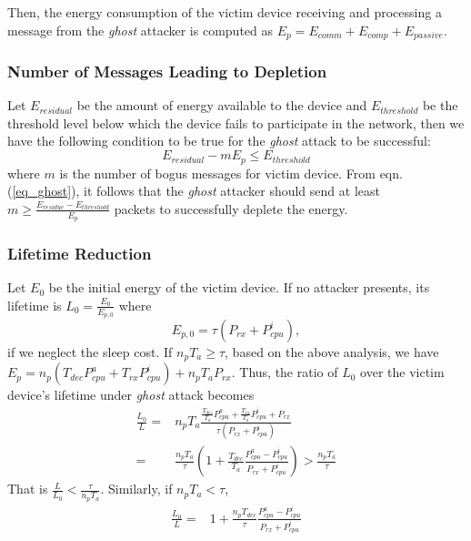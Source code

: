 \documentclass[10pt,journal,cspaper,compsoc]{IEEEtran}
\begin{document}
Then, the energy consumption of the victim device receiving and processing a message from the {\em ghost} attacker is computed as $E_{p} = E_{comm} + E_{comp} + E_{passive}$.

\subsubsection{Number of Messages Leading to Depletion}
Let $E_{residual}$ be the amount of energy available to the device and $E_{threshold}$ be the threshold level below which the device fails to participate in the network, then we have the following condition to be true for the {\em ghost} attack to be successful:
\begin{equation}
E_{residual}-mE_{p} \leq E_{threshold}
\label{eq_ghost}
\end{equation}
where $m$ is the number of bogus messages for victim device. From eqn.(\ref{eq_ghost}), it follows that the {\em ghost} attacker should send at least $m \geq \frac{E_{residue}-E_{threshold}}{E_p}$ packets to successfully deplete the energy.

\subsubsection{Lifetime Reduction}
Let $E_0$ be the initial energy of the victim device. If no attacker presents, its lifetime is $L_0=\frac{E_0}{E_{p,0}}$ where
\begin{equation}
    E_{p,0} = \tau (P_{rx}+P_{cpu}^i),
\end{equation}
if we neglect the sleep cost. If $n_p T_a\geq \tau$, based on the above analysis, we have $E_p = n_p(T_{dec}P^a_{cpu}+ T_{rx}P^i_{cpu}) + n_p T_{a} P_{rx}$. Thus, the ratio of $L_0$ over the victim device's lifetime under {\em ghost} attack becomes
      \begin{align}
      \nonumber       \frac{L_0}{L} =& n_p T_{a} \frac{\frac{T_{dec}}{T_a}P^a_{cpu}+ \frac{T_{rx}}{T_a}P^i_{cpu} + P_{rx}}{\tau (P_{rx}+P_{cpu}^i)}\\
                      =& \frac{n_p T_{a}}{\tau} \left(1+\frac{T_{dec}}{T_a} \frac{P^a_{cpu}-P^i_{cpu}}{P_{rx}+P_{cpu}^i}\right) > \frac{n_p T_{a}}{\tau}
      \end{align}
That is $\frac{L}{L_0} < \frac{\tau}{n_p T_{a}}$. Similarly, if $n_p T_a< \tau$, \begin{align}
             \frac{L_0}{L} =& 1+\frac{n_pT_{dec}}{\tau} \frac{P^a_{cpu}-P^i_{cpu}}{P_{rx}+P_{cpu}^i}
      \end{align}
\end{document}
